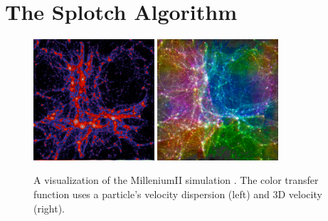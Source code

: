 \documentclass[1p,times]{elsarticle}
\begin{document}


\section{The Splotch Algorithm}
\label{splotch}

\begin{figure}
\begin{center}
\includegraphics[width=0.40\textwidth]{millenium2_veldisp.pdf}
\includegraphics[width=0.40\textwidth]{millenium2_vel.pdf}
\end{center}
\caption{A visualization  of the MilleniumII simulation \citep{2009MNRAS.398.1150B}. The color transfer function uses a particle's velocity dispersion (left) and 3D velocity (right).}\label{mil2}
\end{figure}
\end{document}
